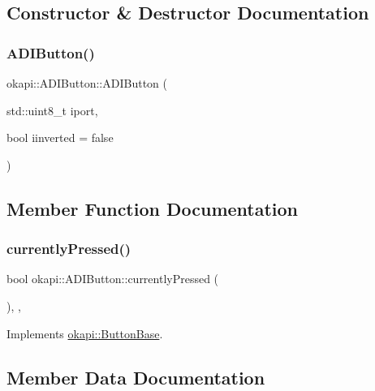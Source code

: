 \subsection{Constructor \& Destructor Documentation}
\mbox{\label{classokapi_1_1ADIButton_a84065174f1fd89bfb1aba7634c4c36d9}} 
\subsubsection{\texorpdfstring{ADIButton()}{ADIButton()}}
{\footnotesize\ttfamily okapi\+::\+A\+D\+I\+Button\+::\+A\+D\+I\+Button (\begin{DoxyParamCaption}\item[{std\+::uint8\+\_\+t}]{iport,  }\item[{bool}]{iinverted = {\ttfamily false} }\end{DoxyParamCaption})}



\subsection{Member Function Documentation}
\mbox{\label{classokapi_1_1ADIButton_af37e345e8239a572021c0b0b31f859aa}} 
\subsubsection{\texorpdfstring{currentlyPressed()}{currentlyPressed()}}
{\footnotesize\ttfamily bool okapi\+::\+A\+D\+I\+Button\+::currently\+Pressed (\begin{DoxyParamCaption}{ }\end{DoxyParamCaption})\hspace{0.3cm}{\ttfamily [override]}, {\ttfamily [protected]}, {\ttfamily [virtual]}}



Implements \mbox{\hyperlink{classokapi_1_1ButtonBase_a748b6f2b5ebce9fa9f6bbc9d170d3d7a}{okapi\+::\+Button\+Base}}.



\subsection{Member Data Documentation}
\mbox{\label{classokapi_1_1ADIButton_a0bded65076f7c921a55377a5abe0b407}} 
